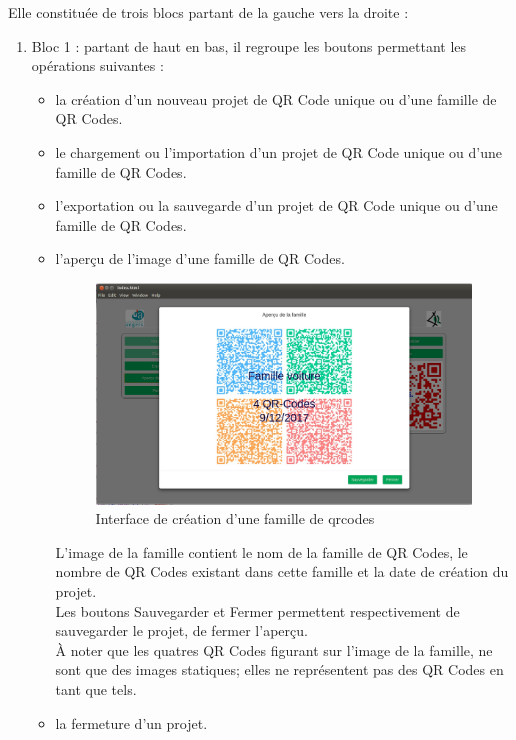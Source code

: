 \par
Elle constituée de trois blocs partant de la gauche vers la droite : 
\begin{enumerate}
\item Bloc 1 : partant de haut en bas, il regroupe les boutons permettant les opérations suivantes :
	\begin{itemize}
	\item la création d'un nouveau projet de QR Code unique ou d'une famille de QR Codes.
	\item le chargement ou l'importation d'un projet de QR Code unique ou d'une famille de QR Codes.
	\item l'exportation ou la sauvegarde d'un projet de QR Code unique ou d'une famille de QR Codes.
	\item l'aperçu de l'image d'une famille de QR Codes.
		\begin{figure}[!h]
			\centering
		   	\includegraphics[scale=0.25]{img/image-famille.png}
		   	\caption{Interface de création d'une famille de qrcodes}
		\end{figure}
	
	L'image de la famille contient le nom de la famille de QR Codes, le nombre de QR Codes existant dans cette famille et la date de création du projet.\\
	Les boutons Sauvegarder et Fermer permettent respectivement de sauvegarder le projet, de fermer l'aperçu.\\
	À noter que les quatres QR Codes figurant sur l'image de la famille, ne sont que des images statiques; elles ne représentent pas des QR Codes en tant que tels.
	
	\item la fermeture d'un projet.
	\end{itemize}
	

\end{enumerate}
